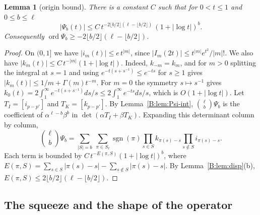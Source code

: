 \documentclass[11pt,a4paper]{article}
\newtheorem{lemma}[theorem]{Lemma}
\theoremstyle{definition}
\theoremstyle{remark}
\newcommand{\fl}[1]{\lfloor #1\rfloor}
\DeclareMathOperator{\ord}{ord}
\DeclareMathOperator{\sgn}{sgn}
\numberwithin{equation}{section}
\begin{document}
\begin{lemma}[origin bound]\label{B:lem:origin}
There is a constant $C$ such that for $0<t\le1$ and $0\le b\le\ell$
\[
|\Psi_b(t)|\le C\,t^{-2\fl{b/2}(\ell-\fl{b/2})}\,(1+|\log t|)^{b}.
\]
Consequently $\ord\Psi_b\ge-2\fl{b/2}(\ell-\fl{b/2})$.
\end{lemma}

\begin{proof}
On $(0,1]$ we have $|i_m(t)|\le e\,t^{|m|}$, since $|I_m(2t)|\le t^{|m|}e^{t^2}/|m|!$. We also have $|k_m(t)|\le C\,t^{-|m|}(1+|\log t|)$. Indeed, $k_{-m}=k_m$, and for $m>0$ splitting the integral at $s=1$ and using $e^{-t(s+s^{-1})}\le e^{-ts}$ for $s\ge1$ gives $|k_m(t)|\le 1/m+\Gamma(m)t^{-m}$. For $m=0$ the symmetry $s\mapsto s^{-1}$ gives $k_0(t)=2\int_1^\infty e^{-t(s+s^{-1})}ds/s\le2\int_1^\infty e^{-ts}ds/s$, which is $O(1+|\log t|)$. Let $T_I=[i_{p-p'}]$ and $T_K=[k_{p-p'}]$. By Lemma~\ref{B:lem:Psi-int}, $\binom{\ell}{b}\Psi_b$ is the coefficient of $\alpha^{\ell-b}\beta^b$ in $\det(\alpha T_I+\beta T_K)$. Expanding this determinant column by column,
\[
\binom{\ell}{b}\Psi_b=\sum_{|S|=b}\ \sum_{\pi\in S_\ell}\sgn(\pi)\prod_{s\in S}k_{\pi(s)-s}\prod_{s\notin S}i_{\pi(s)-s}.
\]
Each term is bounded by $C\,t^{-E(\pi,S)}(1+|\log t|)^b$, where $E(\pi,S)=\sum_{s\in S}|\pi(s)-s|-\sum_{s\notin S}|\pi(s)-s|$. By Lemma~\ref{B:lem:disp}(b), $E(\pi,S)\le2\fl{b/2}(\ell-\fl{b/2})$.
\end{proof}

\subsection{The squeeze and the shape of the operator}
\end{document}

